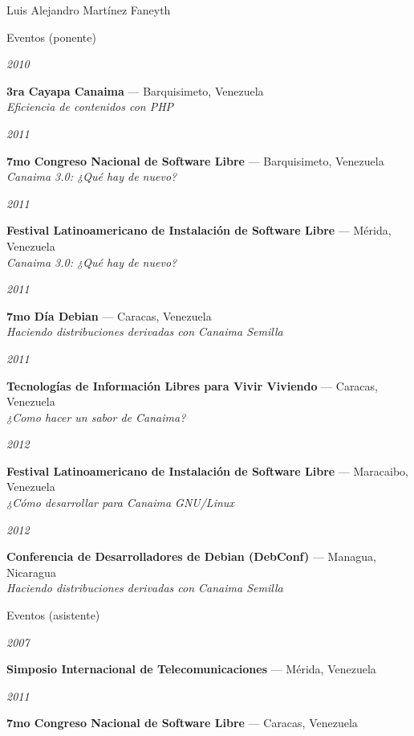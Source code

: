 \documentclass[letterpaper]{scrartcl}
\begin{document}
\begin{cv}{Luis Alejandro Mart\'inez Faneyth}
\begin{cvlist}{Eventos (ponente)}
\item[{\parbox[t]{6em}{\textit{\large{2010}}}}]{
	\parbox[t]{\linewidth}{
		\textbf{3ra Cayapa Canaima} --- Barquisimeto, Venezuela\\
		\textit{Eficiencia de contenidos con PHP}
	}
}
\item[{\parbox[t]{6em}{\textit{\large{2011}}}}]{
	\parbox[t]{\linewidth}{
		\textbf{7mo Congreso Nacional de Software Libre} --- Barquisimeto, Venezuela\\
		\textit{Canaima 3.0: ¿Qu\'e hay de nuevo?}
	}
}
\item[{\parbox[t]{6em}{\textit{\large{2011}}}}]{
	\parbox[t]{\linewidth}{
		\textbf{Festival Latinoamericano de Instalaci\'on de Software Libre} --- M\'erida, Venezuela\\
		\textit{Canaima 3.0: ¿Qu\'e hay de nuevo?}
	}
}
\item[{\parbox[t]{6em}{\textit{\large{2011}}}}]{
	\parbox[t]{\linewidth}{
		\textbf{7mo D\'ia Debian} --- Caracas, Venezuela\\
		\textit{Haciendo distribuciones derivadas con Canaima Semilla}
	}
}
\item[{\parbox[t]{6em}{\textit{\large{2011}}}}]{
	\parbox[t]{\linewidth}{
		\textbf{Tecnolog\'ias de Informaci\'on Libres para Vivir Viviendo} --- Caracas, Venezuela\\
		\textit{¿Como hacer un sabor de Canaima?}
	}
}
\item[{\parbox[t]{6em}{\textit{\large{2012}}}}]{
	\parbox[t]{\linewidth}{
		\textbf{Festival Latinoamericano de Instalaci\'on de Software Libre} --- Maracaibo, Venezuela\\
		\textit{¿C\'omo desarrollar para Canaima GNU/Linux}
	}
}
\item[{\parbox[t]{6em}{\textit{\large{2012}}}}]{
	\parbox[t]{\linewidth}{
		\textbf{Conferencia de Desarrolladores de Debian (DebConf)} --- Managua, Nicaragua\\
		\textit{Haciendo distribuciones derivadas con Canaima Semilla}
	}
}
\end{cvlist}
\vspace{1em}

\begin{cvlist}{Eventos (asistente)}
\item[{\parbox[t]{6em}{\textit{\large{2007}}}}]{
	\parbox[t]{\linewidth}{
		\textbf{Simposio Internacional de Telecomunicaciones} --- M\'erida, Venezuela\\
	}
}
\item[{\parbox[t]{6em}{\textit{\large{2011}}}}]{
	\parbox[t]{\linewidth}{
		\textbf{7mo Congreso Nacional de Software Libre} --- Caracas, Venezuela\\
	}
}
\end{cvlist}
\vspace{1em}


\end{cv}
\end{document}
